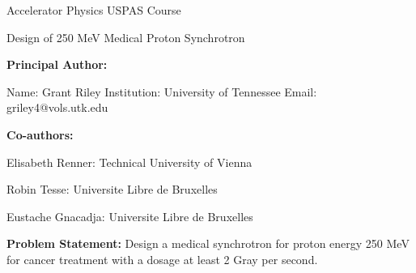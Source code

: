 \documentclass[12pt]{article}
\begin{document}
\def\gs{\ensuremath{\mbox{\, Gy}/s}\xspace}
\def\mev{\ensuremath{\mbox{\,MeV}}\xspace}
\raggedright
\huge
Accelerator Physics USPAS Course \linebreak

Design of 250 MeV Medical Proton Synchrotron \linebreak
\normalsize


\textbf{Principal Author:}

Name: Grant Riley
\linebreak           
Institution:  University of Tennessee
\linebreak
Email: griley4@vols.utk.edu
\linebreak

\textbf{Co-authors:}

Elisabeth Renner: Technical University of Vienna

Robin Tesse: Universite Libre de Bruxelles

Eustache Gnacadja: Universite Libre de Bruxelles 
\linebreak

\textbf{Problem Statement:}
Design a medical synchrotron for proton energy 250 MeV for cancer treatment with a dosage
at least 2 Gray per second.  

\pagebreak


\pagebreak


\end{document}
